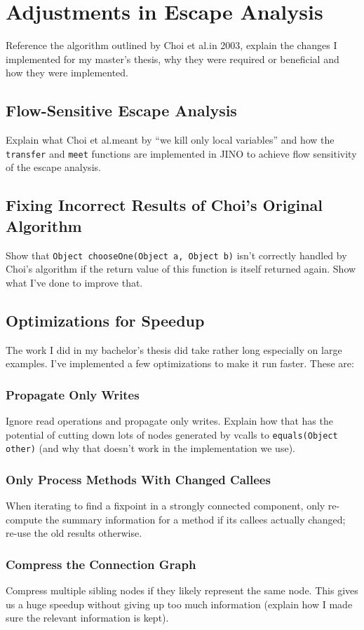 
\chapter{Adjustments in Escape Analysis}
	\label{chapter:changes-eea}
	Reference the algorithm outlined by Choi et al.\@ in 2003, explain the changes I implemented for my master's thesis,
	why they were required or beneficial and how they were implemented.

	\section{Flow-Sensitive Escape Analysis}
		\label{sec:changes-eea:flow-sensitive}
		Explain what Choi et al.\@ meant by \enquote{we kill only local variables} and how the \texttt{transfer} and
		\texttt{meet} functions are implemented in JINO to achieve flow sensitivity of the escape analysis.

	\section{Fixing Incorrect Results of Choi's Original Algorithm}
		\label{sec:changes-eea:bug}
		Show that \texttt{Object chooseOne(Object a, Object b)} isn't correctly handled by Choi's algorithm if the return
		value of this function is itself returned again. Show what I've done to improve that.

	\section{Optimizations for Speedup}
		\label{sec:changes-eea:opt}
		The work I did in my bachelor's thesis did take rather long especially on large examples. I've implemented a few
		optimizations to make it run faster. These are:
		
		\subsection{Propagate Only Writes}
			\label{sub:changes-eea:opt:writeonly}
			Ignore read operations and propagate only writes. Explain how that has the potential of cutting down lots of nodes
			generated by vcalls to \texttt{equals(Object other)} (and why that doesn't work in the implementation we use).

		\subsection{Only Process Methods With Changed Callees}
			\label{sub:changes-eea:opt:quick-fixpoint}
			When iterating to find a fixpoint in a strongly connected component, only re-compute the summary information for
			a method if its callees actually changed; re-use the old results otherwise.

		\subsection{Compress the Connection Graph}
			\label{sub:changes-eea:opt:compression}
			Compress multiple sibling nodes if they likely represent the same node. This gives us a huge speedup without
			giving up too much information (explain how I made sure the relevant information is kept).
